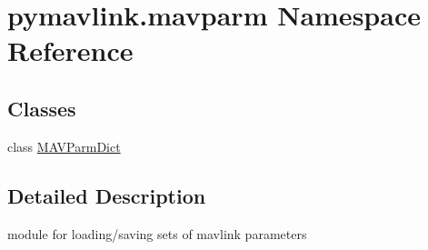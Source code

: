 \hypertarget{namespacepymavlink_1_1mavparm}{}\section{pymavlink.\+mavparm Namespace Reference}
\label{namespacepymavlink_1_1mavparm}
\subsection*{Classes}
\begin{DoxyCompactItemize}
\item 
class \mbox{\hyperlink{classpymavlink_1_1mavparm_1_1MAVParmDict}{M\+A\+V\+Parm\+Dict}}
\end{DoxyCompactItemize}


\subsection{Detailed Description}
\begin{DoxyVerb}module for loading/saving sets of mavlink parameters
\end{DoxyVerb}
 